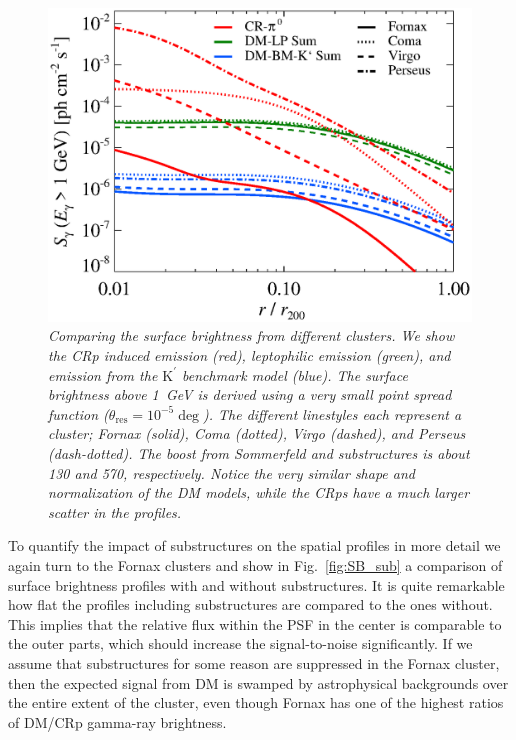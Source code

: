 \documentclass[10pt,aps,pra,reprint,amsmath,amsfonts,amssymb,showpacs]{revtex4-1}
\newcommand{\rmn}{\mathrm}
\newcommand{\psf}{\theta_\rmn{res}}
\newcommand{\Kp}{\rmn{K}^\prime}
\begin{document}
\begin{figure}
 \includegraphics[width=0.99\columnwidth]{figures/SB.v9.1GeV.SF300.SubMass.elmu.eps}
\caption{\it Comparing the surface brightness from different
  clusters. We show the CRp induced emission (red), leptophilic
  emission (green), and emission from the $\Kp$ benchmark model
  (blue). The surface brightness above 1~GeV is derived using a very
  small point spread function ($\psf=10^{-5}\deg$). The
  different linestyles each represent a cluster; Fornax (solid), Coma
  (dotted), Virgo (dashed), and Perseus (dash-dotted). The boost from
  Sommerfeld and substructures is about 130 and 570,
  respectively. Notice the very similar shape and normalization of the DM
  models, while the CRps have a much larger scatter in the profiles.}
 \label{fig:SB_clu}
\end{figure}

To quantify the impact of substructures on the spatial profiles in
more detail we again turn to the Fornax clusters and show in
Fig.~\ref{fig:SB_sub} a comparison of surface brightness profiles with
and without substructures. It is quite remarkable how flat the
profiles including substructures are compared to the ones
without. This implies that the relative flux within the PSF in the
center is comparable to the outer parts, which should increase the
signal-to-noise significantly. If we assume that substructures for
some reason are suppressed in the Fornax cluster, then the expected
signal from DM is swamped by astrophysical backgrounds over the entire
extent of the cluster, even though Fornax has one of the highest
ratios of DM/CRp gamma-ray brightness.
\end{document}
